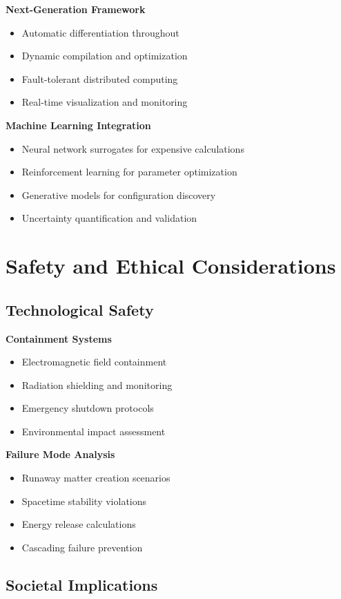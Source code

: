 \documentclass[11pt]{article}
\begin{document}
\textbf{Next-Generation Framework}
\begin{itemize}
\item Automatic differentiation throughout
\item Dynamic compilation and optimization
\item Fault-tolerant distributed computing
\item Real-time visualization and monitoring
\end{itemize}

\textbf{Machine Learning Integration}
\begin{itemize}
\item Neural network surrogates for expensive calculations
\item Reinforcement learning for parameter optimization
\item Generative models for configuration discovery
\item Uncertainty quantification and validation
\end{itemize}

\section{Safety and Ethical Considerations}

\subsection{Technological Safety}

\textbf{Containment Systems}
\begin{itemize}
\item Electromagnetic field containment
\item Radiation shielding and monitoring
\item Emergency shutdown protocols
\item Environmental impact assessment
\end{itemize}

\textbf{Failure Mode Analysis}
\begin{itemize}
\item Runaway matter creation scenarios
\item Spacetime stability violations
\item Energy release calculations
\item Cascading failure prevention
\end{itemize}

\subsection{Societal Implications}
\end{document}
